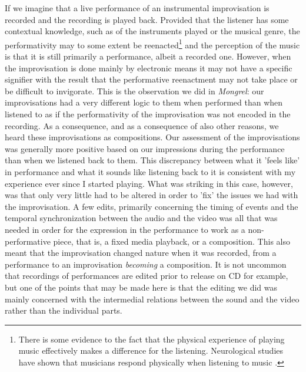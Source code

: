\documentclass[11pt]{article}
\begin{document}
If we imagine that a live performance of an instrumental improvisation
is recorded and the recording is played back. Provided that the
listener has some contextual knowledge, such as of the instruments
played or the musical genre, the performativity may to some extent be
reenacted\footnote{There is some evidence to the fact that the
  physical experience of playing music effectively makes a difference
  for the listening. Neurological studies have shown that musicians
  respond physically when listening to music \citep[See
  e.g.]{bangert2003,overy2009}.} and the perception of the music is
that it is still primarily a performance, albeit a recorded
one. However, when the improvisation is done mainly by electronic means it may not have a
specific signifier with the result that the performative reenactment
may not take place or be difficult to invigorate. This is the
observation we did in \emph{Mongrel}: our improvisations had a very
different logic to them when performed than when listened to as if the
performativity of the improvisation was not encoded in the
recording. As a consequence, and as a consequence of also other reasons, we heard these improvisations as
compositions. Our assessment of the improvisations was generally more
positive based on our impressions during the performance than when we
listened back to them. This discrepancy between what it 'feels like'
in performance and what it sounds like listening back to it is
consistent with my experience ever since I started playing. What was
striking in this case, however, was that only very little had to be
altered in order to 'fix' the issues we had with the improvisation. A
few edits, primarily concerning the timing of events and the temporal
synchronization between the audio and the video was all that was
needed in order for the expression in the performance to work as a
non-performative piece, that is, a fixed media playback, or a
composition. This also meant that the improvisation changed nature
when it was recorded, from a performance to an improvisation
\emph{becoming} a composition. It is not uncommon that recordings of
performances are edited prior to release on CD for example, but one of
the points that may be made here is that the editing we did was mainly
concerned with the intermedial relations between the sound and the
video rather than the individual parts.
\end{document}
